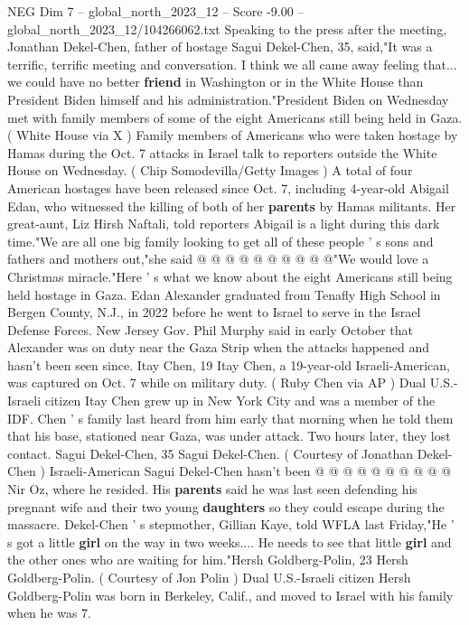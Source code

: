 \begin{textsample}{NEG Dim 7 – global\_north\_2023\_12 – Score -9.00 – global\_north\_2023\_12/104266062.txt}  \label{ex:f7_neg_145}
Speaking to the press after the meeting, Jonathan Dekel-Chen, father of hostage Sagui Dekel-Chen, 35, said,"It was a terrific, terrific meeting and conversation.
I think we all came away feeling that... we could have no better \textbf{friend} in Washington or in the White House than President Biden himself and his administration."President Biden on Wednesday met with family members of some of the eight Americans still being held in Gaza. ( White House via X ) Family members of Americans who were taken hostage by Hamas during the Oct. 7 attacks in Israel talk to reporters outside the White House on Wednesday. ( Chip Somodevilla/Getty Images ) A total of four American hostages have been released since Oct. 7, including 4-year-old Abigail Edan, who witnessed the killing of both of her \textbf{parents} by Hamas militants.
Her great-aunt, Liz Hirsh Naftali, told reporters Abigail is a light during this dark time."We are all one big family looking to get all of these people ' s sons and fathers and mothers out,"she said @ @ @ @ @ @ @ @ @ @"We would love a Christmas miracle."Here ' s what we know about the eight Americans still being held hostage in Gaza.
Edan Alexander graduated from Tenafly High School in Bergen County, N.J., in 2022 before he went to Israel to serve in the Israel Defense Forces.
New Jersey Gov.
Phil Murphy said in early October that Alexander was on duty near the Gaza Strip when the attacks happened and hasn't been seen since.
Itay Chen, 19 Itay Chen, a 19-year-old Israeli-American, was captured on Oct. 7 while on military duty. ( Ruby Chen via AP ) Dual U.S.-Israeli citizen Itay Chen grew up in New York City and was a member of the IDF.
Chen ' s family last heard from him early that morning when he told them that his base, stationed near Gaza, was under attack.
Two hours later, they lost contact.
Sagui Dekel-Chen, 35 Sagui Dekel-Chen. ( Courtesy of Jonathan Dekel-Chen ) Israeli-American Sagui Dekel-Chen hasn't been @ @ @ @ @ @ @ @ @ @ Nir Oz, where he resided.
His \textbf{parents} said he was last seen defending his pregnant wife and their two young \textbf{daughters} so they could escape during the massacre.
Dekel-Chen ' s stepmother, Gillian Kaye, told WFLA last Friday,"He ' s got a little \textbf{girl} on the way in two weeks....
He needs to see that little \textbf{girl} and the other ones who are waiting for him."Hersh Goldberg-Polin, 23 Hersh Goldberg-Polin. ( Courtesy of Jon Polin ) Dual U.S.-Israeli citizen Hersh Goldberg-Polin was born in Berkeley, Calif., and moved to Israel with his family when he was 7.

\end{textsample}
